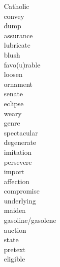 \documentclass[a4paper, 11pt]{ctexart}
\begin{document}
\begin{multicols*}{3}
\begin{description}
\item[Catholic]

\item[convey]

\item[dump]

\item[assurance]

\item[lubricate]

\item[blush]

\item[favo(u)rable]

\item[loosen]

\item[ornament]

\item[senate]

\item[eclipse]

\item[weary]

\item[genre]

\item[spectacular]

\item[degenerate]

\item[imitation]

\item[persevere]

\item[import]

\item[affection]

\item[compromise]

\item[underlying]

\item[maiden]

\item[gasoline/gasolene]

\item[auction]

\item[state]

\item[pretext]

\item[eligible]


\end{description}
\end{multicols*}
\end{document}
